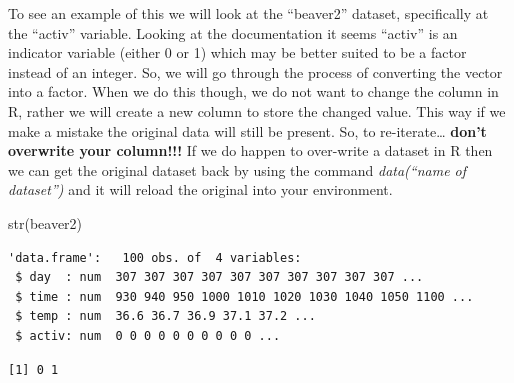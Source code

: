 \documentclass[
  letterpaper,
  DIV=11,
  numbers=noendperiod]{scrreprt}
\newenvironment{Shaded}{\begin{snugshade}}{\end{snugshade}}
\newcommand{\FunctionTok}[1]{\textcolor[rgb]{0.28,0.35,0.67}{#1}}
\newcommand{\NormalTok}[1]{\textcolor[rgb]{0.00,0.23,0.31}{#1}}
\newcommand{\OtherTok}[1]{\textcolor[rgb]{0.00,0.23,0.31}{#1}}
\newcommand{\SpecialCharTok}[1]{\textcolor[rgb]{0.37,0.37,0.37}{#1}}
\newcommand{\StringTok}[1]{\textcolor[rgb]{0.13,0.47,0.30}{#1}}
\begin{document}
To see an example of this we will look at the ``beaver2'' dataset,
specifically at the ``activ'' variable. Looking at the documentation it
seems ``activ'' is an indicator variable (either 0 or 1) which may be
better suited to be a factor instead of an integer. So, we will go
through the process of converting the vector into a factor. When we do
this though, we do not want to change the column in R, rather we will
create a new column to store the changed value. This way if we make a
mistake the original data will still be present. So, to
re-iterate\ldots{} \textbf{don't overwrite your column!!!} If we do
happen to over-write a dataset in R then we can get the original dataset
back by using the command \emph{data(``name of dataset'')} and it will
reload the original into your environment.

\begin{Shaded}
\begin{Highlighting}[]
\FunctionTok{str}\NormalTok{(beaver2)}
\end{Highlighting}
\end{Shaded}

\begin{verbatim}
'data.frame':   100 obs. of  4 variables:
 $ day  : num  307 307 307 307 307 307 307 307 307 307 ...
 $ time : num  930 940 950 1000 1010 1020 1030 1040 1050 1100 ...
 $ temp : num  36.6 36.7 36.9 37.1 37.2 ...
 $ activ: num  0 0 0 0 0 0 0 0 0 0 ...
\end{verbatim}

\begin{Shaded}
\end{Shaded}

\begin{verbatim}
[1] 0 1
\end{verbatim}

\begin{Shaded}
\end{Shaded}
\end{document}
